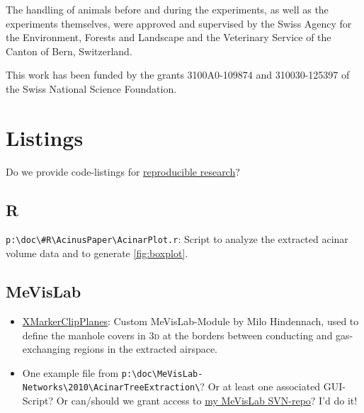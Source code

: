 \documentclass[%
	draft=true,
	paper=a4,%
	twoside=true,%
	abstract=true]{scrartcl}
\newcommand{\threed}{3\textsc{d}\xspace}
\begin{document}
The handling of animals before and during the experiments, as well as the experiments themselves, were approved and supervised by the Swiss Agency for the Environment, Forests and Landscape and the Veterinary Service of the Canton of Bern, Switzerland.

This work has been funded by the grants 3100A0-109874 and 310030-125397  of the Swiss National Science Foundation.




\appendix
\section{Listings}
Do we provide code-listings for \href{http://reproducibleresearch.net}{reproducible research}?
\subsection{R}
\verb+p:\doc\#R\AcinusPaper\AcinarPlot.r+: Script to analyze the extracted acinar volume data and to generate \autoref{fig:boxplot}.

\subsection{MeVisLab}
\begin{itemize}
	\item \href{http://www.mevis-research.de/cgi-bin/discus/board-auth.cgi?lm=1282233250&file=/839/11760.html}{XMarkerClipPlanes}: Custom MeVisLab-Module by Milo Hindennach, used to define the manhole covers in \threed at the borders between conducting and gas-exchanging regions in the extracted airspace.
	\item One example file from \verb+p:\doc\MeVisLab-Networks\2010\AcinarTreeExtraction\+? Or at least one associated GUI-Script? Or can/should we grant access to \href{http://code.ana.unibe.ch/websvn/listing.php?repname=MeVisLab-Networks}{my MeVisLab SVN-repo}? I’d do it!
\end{itemize}
 
\end{document}

